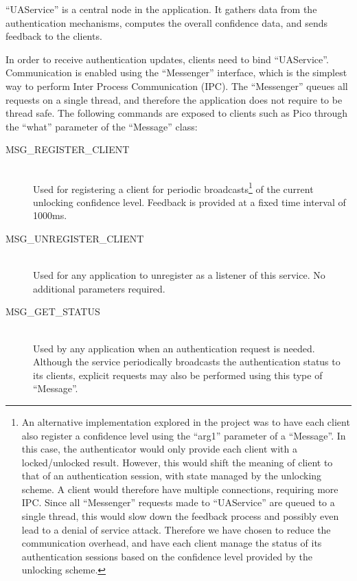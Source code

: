 ``UAService'' is a central node in the application. It gathers data from the authentication mechanisms, computes the overall confidence data, and sends feedback to the clients. 

In order to receive authentication updates, clients need to bind ``UAService''. Communication is enabled using the ``Messenger'' interface, which is the simplest way to perform Inter Process Communication (IPC). The ``Messenger'' queues all requests on a single thread, and therefore the application does not require to be thread safe. The following commands are exposed to clients such as Pico through the ``what'' parameter of the ``Message'' class:
\begin{description}
  \item[MSG\_REGISTER\_CLIENT] \hfill \\
  Used for registering a client for periodic broadcasts\footnote{An alternative implementation explored in the project was to have each client also register a confidence level using the ``arg1'' parameter of a ``Message''. In this case, the authenticator would only provide each client with a locked/unlocked result. However, this would shift the meaning of client to that of an authentication session, with state managed by the unlocking scheme. A client would therefore have multiple connections, requiring more IPC. Since all ``Messenger'' requests made to ``UAService'' are queued to a single thread, this would slow down the feedback process and possibly even lead to a denial of service attack. Therefore we have chosen to reduce the communication overhead, and have each client manage the status of its authentication sessions based on the confidence level provided by the unlocking scheme.} of the current unlocking confidence level. Feedback is provided at a fixed time interval of 1000ms.

  \item[MSG\_UNREGISTER\_CLIENT] \hfill \\
  Used for any application to unregister as a listener of this service. No additional parameters required.
  
  \item[MSG\_GET\_STATUS] \hfill \\
  Used by any application when an authentication request is needed. Although the service periodically broadcasts the authentication status to its clients, explicit requests may also be performed using this type of ``Message''.
\end{description}

